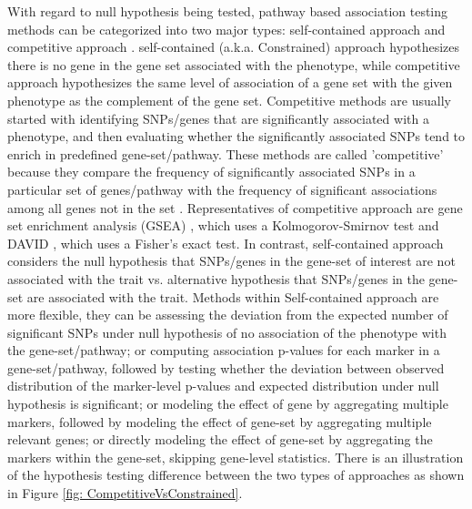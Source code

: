 \documentclass[12pt]{article}
\begin{document}
With regard to null hypothesis being tested, pathway based association testing methods can be categorized into two major types: self-contained approach and competitive approach \cite{Goeman2007,Liu2007,Nam2008,Wang2010,Fridley2010,Fridley2011}. self-contained (a.k.a. Constrained) approach hypothesizes there is no gene in the gene set associated with the phenotype, while competitive approach hypothesizes the same level of association of a gene set with the given phenotype as the complement of the gene set. Competitive methods are usually started with identifying SNPs/genes that are significantly associated with a phenotype, and then evaluating whether the significantly associated SNPs tend to enrich in predefined gene-set/pathway. These methods are called 'competitive' because they compare the frequency of significantly associated SNPs in a particular set of genes/pathway with the frequency of significant associations among all genes not in the set \cite{Fridley2011}. Representatives of competitive approach are gene set enrichment analysis (GSEA) \cite{Subramanian2005}, which uses a Kolmogorov-Smirnov test and DAVID \cite{DennisJr2003}, which uses a Fisher's exact test. In contrast, self-contained approach considers the null hypothesis that SNPs/genes in the gene-set of interest are not associated with the trait vs. alternative hypothesis that SNPs/genes in the gene-set are associated with the trait. Methods within Self-contained approach are more flexible, they can be assessing the deviation from the expected number of significant SNPs under null hypothesis of no association of the phenotype with the gene-set/pathway; or computing association p-values for each marker in a gene-set/pathway, followed by testing whether the deviation between observed distribution of the marker-level p-values and expected distribution under null hypothesis is significant; or modeling the effect of gene by aggregating multiple markers, followed by modeling the effect of gene-set by aggregating multiple relevant genes; or directly modeling the effect of gene-set by aggregating the markers within the gene-set, skipping gene-level statistics. There is an illustration of the hypothesis testing difference between the two types of approaches as shown in Figure \ref{fig: CompetitiveVsConstrained}.
\end{document}
